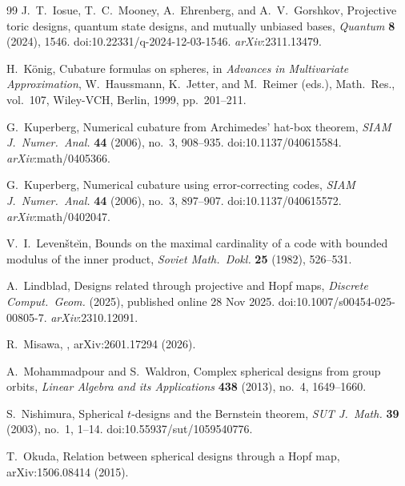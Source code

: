 \documentclass{amsart}
\theoremstyle{definition}
\theoremstyle{remark}
\numberwithin{equation}{section}
\begin{document}
\begin{thebibliography}{99}
J.~T.~Iosue, T.~C.~Mooney, A.~Ehrenberg, and A.~V.~Gorshkov,
\newblock Projective toric designs, quantum state designs, and mutually unbiased bases,
\newblock \emph{Quantum} \textbf{8} (2024), 1546.
\newblock doi:10.22331/q-2024-12-03-1546.
\newblock \emph{arXiv}:2311.13479.

H.~K\"onig,
\newblock Cubature formulas on spheres,
\newblock in \emph{Advances in Multivariate Approximation},
\newblock W.~Haussmann, K.~Jetter, and M.~Reimer (eds.),
\newblock Math.\ Res., vol.~107, Wiley-VCH, Berlin, 1999, pp.~201--211.

G.~Kuperberg,
\newblock Numerical cubature from Archimedes' hat-box theorem,
\newblock \emph{SIAM J.\ Numer.\ Anal.} \textbf{44} (2006), no.~3, 908--935.
\newblock doi:10.1137/040615584.
\newblock \emph{arXiv}:math/0405366.

G.~Kuperberg,
\newblock Numerical cubature using error-correcting codes,
\newblock \emph{SIAM J.\ Numer.\ Anal.} \textbf{44} (2006), no.~3, 897--907.
\newblock doi:10.1137/040615572.
\newblock \emph{arXiv}:math/0402047.

V.~I.~Leven\v{s}te\u{\i}n,
\newblock Bounds on the maximal cardinality of a code with bounded modulus of the inner product,
\newblock \emph{Soviet Math.\ Dokl.} \textbf{25} (1982), 526--531.

A.~Lindblad,
\newblock Designs related through projective and Hopf maps,
\newblock \emph{Discrete Comput.\ Geom.} (2025), published online 28 Nov 2025.
\newblock doi:10.1007/s00454-025-00805-7.
\newblock \emph{arXiv}:2310.12091.

R.~Misawa,
,
\newblock \emph{} arXiv:2601.17294 (2026).

A.~Mohammadpour and S.~Waldron,
\newblock Complex spherical designs from group orbits,
\newblock \emph{Linear Algebra and its Applications} \textbf{438} (2013), no.~4, 1649--1660.

S.~Nishimura,
\newblock Spherical $t$-designs and the Bernstein theorem,
\newblock \emph{SUT J.\ Math.} \textbf{39} (2003), no.~1, 1--14.
\newblock doi:10.55937/sut/1059540776.

T.~Okuda,
\newblock Relation between spherical designs through a Hopf map,
\newblock arXiv:1506.08414 (2015).


\end{thebibliography}
\end{document}
